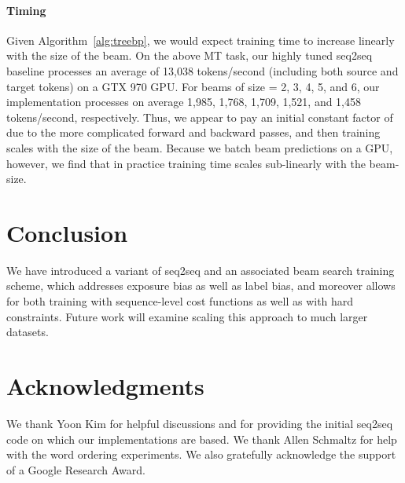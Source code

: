 \documentclass[11pt,letterpaper]{article}
\begin{document}
\paragraph{Timing}
Given Algorithm~\ref{alg:treebp}, we would expect training time to increase linearly with the size of the beam. On the above MT task, our highly tuned seq2seq baseline processes an average of 13,038 tokens/second (including both source and target tokens) on a GTX 970 GPU. For beams of size  = 2, 3, 4, 5, and 6, our implementation processes on average 1,985, 1,768, 1,709, 1,521, and 1,458 tokens/second, respectively. Thus, we appear to pay an initial constant factor of  due to the more complicated forward and backward passes, and then training scales with the size of the beam. Because we batch beam predictions on a GPU, however, we find that in practice training time scales sub-linearly with the beam-size. 

\section{Conclusion}
We have introduced a variant of seq2seq and an associated beam search training scheme, which addresses exposure bias as well as label bias, and moreover allows for both training with sequence-level cost functions as well as with hard constraints. Future work will examine scaling this approach to much larger datasets.




 
\section*{Acknowledgments} We thank Yoon Kim for helpful discussions and for providing the initial seq2seq code on which our implementations are based. We thank Allen Schmaltz for help with the word ordering experiments. We also gratefully acknowledge the support of a Google Research Award.

\nocite{bahdanau16an}



\end{document}
